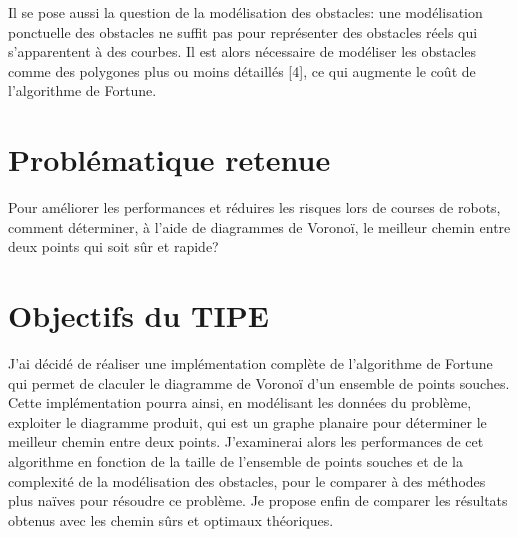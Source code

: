 \documentclass[a4paper]{article}
\begin{document}
Il se pose aussi la question de la modélisation des obstacles: une modélisation ponctuelle des obstacles ne suffit pas pour représenter des obstacles réels qui s'apparentent à des courbes. Il est alors nécessaire de modéliser les obstacles comme des polygones plus ou moins détaillés [4], ce qui augmente le coût de l'algorithme de Fortune.


\section*{Problématique retenue}
Pour améliorer les performances et réduires les risques lors de courses de robots, comment déterminer, à l'aide de diagrammes de Voronoï, le meilleur chemin entre deux points qui soit sûr et rapide?


\section*{Objectifs du TIPE}
J'ai décidé de réaliser une implémentation complète de l'algorithme de Fortune qui permet de claculer le diagramme de Voronoï d'un ensemble de points souches.
Cette implémentation pourra ainsi, en modélisant les données du problème, exploiter le diagramme produit, qui est un graphe planaire pour déterminer le meilleur chemin entre deux points.
J'examinerai alors les performances de cet algorithme en fonction de la taille de l'ensemble de points souches et de la complexité de la modélisation des obstacles, pour le comparer à des méthodes plus naïves pour résoudre ce problème.
Je propose enfin de comparer les résultats obtenus avec les chemin sûrs et optimaux théoriques.
\end{document}
